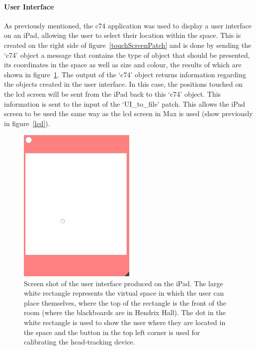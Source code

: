\documentclass[../../main.tex]{subfiles}
\begin{document}
		\paragraph{User Interface}
			As previously mentioned, the c74 application was used to display a user interface on an iPad, allowing the user to select their location within the space. This is created on the right side of figure~\ref{touchScreenPatch} and is done by sending the `c74' object a message that contains the type of object that should be presented, its coordinates in the space as well as size and colour, the results of which are shown in figure~\ref{UIdot}. The output of the `c74' object returns information regarding the objects created in the user interface. In this case, the positions touched on the lcd screen will be sent from the iPad back to this `c74' object. This information is sent to the input of the `UI\_to\_file' patch. This allows the iPad screen to be used the same way as the lcd screen in Max is used (show previously in figure~\ref{lcd}).

			\begin{figure}[t]
				\centerline{\includegraphics[width=0.5\textwidth]{Sections/Implementation/Max/images/Max/UserInterface/UI_dot.png}}
				\caption{Screen shot of the user interface produced on the iPad. The large white rectangle represents the virtual space in which the user can place themselves, where the top of the rectangle is the front of the room (where the blackboards are in Hendrix Hall). The dot in the white rectangle is used to show the user where they are located in the space and the button in the top left corner is used for calibrating the head-tracking device.}
				\label{UIdot}
			\end{figure}
\end{document}

